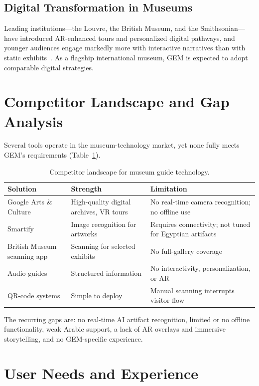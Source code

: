 \subsection{Digital Transformation in Museums}
Leading institutions---the Louvre, the British Museum, and the Smithsonian---have
introduced AR-enhanced tours and personalized digital pathways,
and younger audiences engage markedly more with interactive narratives than with static
exhibits~\citep{cho2025augmenting,choiimmersive}. As a flagship international museum, GEM
is expected to adopt comparable digital strategies.

\section{Competitor Landscape and Gap Analysis}

Several tools operate in the museum-technology market, yet none fully meets GEM's
requirements (Table~\ref{tab:competitors}).

\begin{table}[htbp]
\centering
\caption{Competitor landscape for museum guide technology.}
\label{tab:competitors}
\begin{tabularx}{\textwidth}{@{}l>{\raggedright\arraybackslash}X>{\raggedright\arraybackslash}X@{}}
\toprule
\textbf{Solution} & \textbf{Strength} & \textbf{Limitation}\\
\midrule
Google Arts \& Culture & High-quality digital archives, VR tours & No real-time camera recognition; no offline use\\
Smartify & Image recognition for artworks & Requires connectivity; not tuned for Egyptian artifacts\\
British Museum scanning app & Scanning for selected exhibits & No full-gallery coverage\\
Audio guides & Structured information & No interactivity, personalization, or AR\\
QR-code systems & Simple to deploy & Manual scanning interrupts visitor flow\\
\bottomrule
\end{tabularx}
\end{table}

The recurring gaps are: no real-time AI artifact recognition, limited or no offline
functionality, weak Arabic support, a lack of AR overlays and immersive storytelling,
and no GEM-specific experience.

\section{User Needs and Experience}

